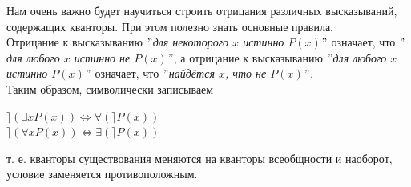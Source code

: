 Нам очень важно будет научиться строить отрицания различных высказываний, содержащих кванторы. При этом полезно знать основные правила.\\
Отрицание к высказыванию \textit{$"$для некоторого $x$ истинно $P(x)$$"$} означает, что \textit{$"$для любого $x$ истинно не $P(x)$$"$}, а отрицание к высказыванию \textit{$"$для любого $x$ истинно $P(x)$$"$} означает, что \textit{$"$найдётся $x$, что не $P(x)$$"$.}\\
Таким образом, символически записываем
\begin{center}
	$\rceil(\exists x P(x)) \Leftrightarrow \forall (\rceil P(x))$\\
	$\rceil(\forall x P(x)) \Leftrightarrow \exists (\rceil P(x))$
\end{center}
т. е. кванторы существования меняются на кванторы всеобщности и наоборот, условие заменяется противоположным.
